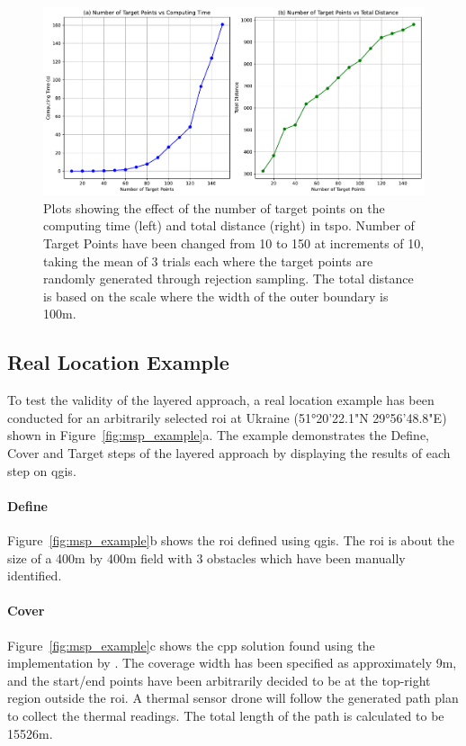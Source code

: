 \begin{figure}[h!]
    \centering
    \includegraphics[width=\linewidth]{figs/Jihwan/target_points_vs.pdf}
    \caption[Effect of Number of Target Points on Computing Time and Total Distance of TSP-O Solution]
    {Plots showing the effect of the number of target points on the computing time (left) and total distance (right) in \gls{tspo}. Number of Target Points have been changed from 10 to 150 at increments of 10, taking the mean of 3 trials each where the target points are randomly generated through rejection sampling. The total distance is based on the scale where the width of the outer boundary is 100m.}
    \label{fig:msp_tspo_plot}
\end{figure}

\subsection{Real Location Example}
\label{sec:msp_example}

To test the validity of the layered approach, a real location example has been conducted for an arbitrarily selected \gls{roi} at Ukraine (51°20'22.1"N 29°56'48.8"E) shown in Figure~\ref{fig:msp_example}a. The example demonstrates the Define, Cover and Target steps of the layered approach by displaying the results of each step on \gls{qgis}. 

\paragraph{Define} Figure~\ref{fig:msp_example}b shows the \gls{roi} defined using \gls{qgis}. The \gls{roi} is about the size of a 400m by 400m field with 3 obstacles which have been manually identified.  

\paragraph{Cover} Figure~\ref{fig:msp_example}c shows the \gls{cpp} solution found using the implementation by \cite{bahnemann2021cpp}. The coverage width has been specified as approximately 9m, and the start/end points have been arbitrarily decided to be at the top-right region outside the \gls{roi}. A thermal sensor drone will follow the generated path plan to collect the thermal readings. The total length of the path is calculated to be 15526m.

